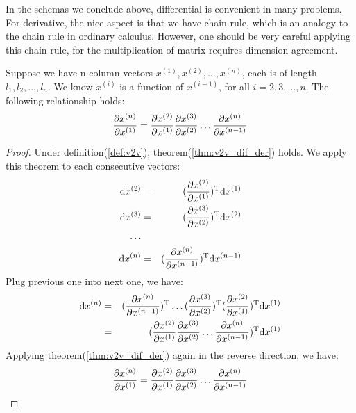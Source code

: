 In the schemas we conclude above, differential is convenient in 
many problems. For derivative, the nice aspect is that we have chain rule, 
which is an analogy to the chain rule in ordinary calculus. However, 
one should be very careful applying this chain rule, for the multiplication 
of matrix requires dimension agreement. 

\begin{mythm}
Suppose we have n column vectors $x^{(1)},x^{(2)},\ldots, x^{(n)}$, each 
is of length $l_1, l_2, \ldots, l_n$. We know $x^{(i)}$ is a function 
of $x^{(i-1)}$, for all $i=2, 3, \dots, n$. The following relationship 
holds:
\begin{equation}
	\dfrac{\partial x^{(n)}}{\partial x^{(1)}} = \dfrac{\partial x^{(2)}}{\partial x^{(1)}}
	\dfrac{\partial x^{(3)}}{\partial x^{(2)}} \ldots \dfrac{\partial x^{(n)}}{\partial x^{(n-1)}}
\end{equation}
\end{mythm}

\begin{proof}
Under definition(\ref{def:v2v}), theorem(\ref{thm:v2v_dif_der}) holds. 
We apply this theorem to each consecutive vectors:
\begin{eqnarray}
	\mathrm{d}x^{(2)} &=& (\dfrac{\partial x^{(2)}}{\partial x^{(1)}})^\mathrm{T} \mathrm{d}x^{(1)} \\
	\mathrm{d}x^{(3)} &=& (\dfrac{\partial x^{(3)}}{\partial x^{(2)}})^\mathrm{T} \mathrm{d}x^{(2)} \\
	\ldots \\
	\mathrm{d}x^{(n)} &=& (\dfrac{\partial x^{(n)}}{\partial x^{(n-1)}})^\mathrm{T} \mathrm{d}x^{(n-1)}
\end{eqnarray} 
Plug previous one into next one, we have:
\begin{eqnarray}
	\mathrm{d}x^{(n)} &=& (\dfrac{\partial x^{(n)}}{\partial x^{(n-1)}})^\mathrm{T} 
	\ldots
	(\dfrac{\partial x^{(3)}}{\partial x^{(2)}})^\mathrm{T} 
	(\dfrac{\partial x^{(2)}}{\partial x^{(1)}})^\mathrm{T} 
	\mathrm{d}x^{(1)} \\
	&=& (\dfrac{\partial x^{(2)}}{\partial x^{(1)}} \dfrac{\partial x^{(3)}}{\partial x^{(2)}}
	\ldots \dfrac{\partial x^{(n)}}{\partial x^{(n-1)}} )^\mathrm{T} \mathrm{d}x^{(1)}
\end{eqnarray}
Applying theorem(\ref{thm:v2v_dif_der}) again in the reverse direction, 
we have:
\begin{equation}
	\dfrac{\partial x^{(n)}}{\partial x^{(1)}} = \dfrac{\partial x^{(2)}}{\partial x^{(1)}}
	\dfrac{\partial x^{(3)}}{\partial x^{(2)}} \ldots \dfrac{\partial x^{(n)}}{\partial x^{(n-1)}}
\end{equation}
\end{proof}

